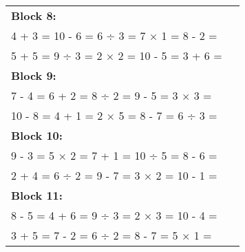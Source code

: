 \documentclass[a4paper,12pt]{scrartcl}
\begin{document}
\begin{adjustbox}{center, valign=c}
\begin{tabular}{@{}p{0.95\linewidth}@{}}
\textbf{Block 8:}\\
4 + 3 = \hfill 10 - 6 = \hfill 6 ÷ 3 = \hfill 7 × 1 = \hfill 8 - 2 =\\
5 + 5 = \hfill 9 ÷ 3 = \hfill 2 × 2 = \hfill 10 - 5 = \hfill 3 + 6 =\\[0.6em]

\textbf{Block 9:}\\
7 - 4 = \hfill 6 + 2 = \hfill 8 ÷ 2 = \hfill 9 - 5 = \hfill 3 × 3 =\\
10 - 8 = \hfill 4 + 1 = \hfill 2 × 5 = \hfill 8 - 7 = \hfill 6 ÷ 3 =\\[0.6em]

\textbf{Block 10:}\\
9 - 3 = \hfill 5 × 2 = \hfill 7 + 1 = \hfill 10 ÷ 5 = \hfill 8 - 6 =\\
2 + 4 = \hfill 6 ÷ 2 = \hfill 9 - 7 = \hfill 3 × 2 = \hfill 10 - 1 =\\[0.6em]

\textbf{Block 11:}\\
8 - 5 = \hfill 4 + 6 = \hfill 9 ÷ 3 = \hfill 2 × 3 = \hfill 10 - 4 =\\
3 + 5 = \hfill 7 - 2 = \hfill 6 ÷ 2 = \hfill 8 - 7 = \hfill 5 × 1 =\\[0.6em]

\end{tabular}
\end{adjustbox}
\end{document}
